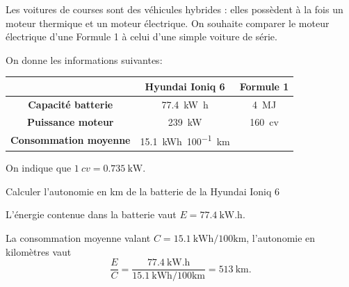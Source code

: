 \hauteurLargeurCadreReponse		{8mm}{4cm}
\initialisationEntrainement



\debutEntrainement


Les voitures de courses  sont des véhicules hybrides : elles possèdent à la fois un moteur thermique 
et un moteur électrique. On souhaite comparer le moteur électrique d'une Formule 1 à celui d'une simple voiture de série.

On donne les informations suivantes:

\begin{center}
\def\monEspace{\mbox{\phantom{aa}}}
\renewcommand{\arraystretch}{1.2}
\begin{tabular}{|c|c|c|}
\hline
& \monEspace{}\textbf{Hyundai Ioniq 6}\monEspace{} & \monEspace{}\textbf{Formule 1}\monEspace{} \\
\hline
\textbf{Capacité batterie} & \SI{77,4}{\kilo\watt . \hour} & \SI{4}{\mega\joule}\\
\hline
\textbf{Puissance moteur} &\SI{239}{\kilo\watt} & \SI{160}{cv} \\
\hline
\monEspace{}\textbf{Consommation moyenne}\monEspace{} & \SI{15,1}{\kWh \per 100 \kilo\meter} & \\
\hline
\end{tabular}
\renewcommand{\arraystretch}{1}
\end{center}

On indique que $\SI{1}{cv}=\SI{0,735}{\kW}$.


\begin{enonce}
Calculer l'autonomie en \si{\kilo\meter} de la batterie de la Hyundai Ioniq 6
\end{enonce}


\begin{corrige}
L'énergie contenue dans la batterie vaut $E=\SI{77,4}{\kilo\watt.\hour}$. 

La consommation moyenne valant $C=\SI{15,1}{\kWh \per 100 \kilo\meter}$, l'autonomie en kilomètres vaut
\[
\frac{E}{C}
=
\frac{\SI{77,4}{\kilo\watt .\hour}}{\SI{15,1}{\kWh \per 100 \kilo\meter}}=\SI{513}{\km}.
\]
\end{corrige}

